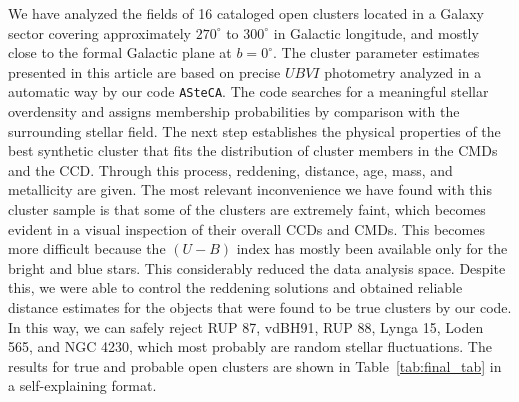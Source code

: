 \documentclass[draft]{aa}
\begin{document}
We have analyzed the fields of 16 cataloged open clusters located in a
Galaxy sector covering approximately $270^\circ$ to $300^\circ$  in
Galactic longitude, and mostly close to the formal Galactic plane at
$b=0^\circ$.
The cluster parameter estimates presented in this article are based on
precise $UBVI$ photometry analyzed in a automatic way by our code 
\texttt{ASteCA}. The code searches for a meaningful stellar overdensity
and assigns membership probabilities by comparison with the surrounding stellar
field.
The next step establishes the physical properties of the best synthetic cluster
that fits the distribution of cluster members in the CMDs and the CCD.
Through this process, reddening, distance, age, mass, and metallicity are
given.
The most relevant inconvenience we have found with this cluster
sample is that some of the clusters are extremely faint, which
becomes evident in a visual inspection of their overall CCDs and CMDs.
This becomes more difficult because the $(U-B)$ index has mostly been available
only for the bright and blue stars. This considerably reduced the data analysis
space. Despite this, we were able to control the reddening solutions
and obtained reliable distance estimates for the objects that were found to be 
true clusters by our code. In this way, we can safely reject RUP 87, vdBH91,
RUP 88, Lynga 15, Loden 565, and NGC 4230, which most probably are random
stellar fluctuations. The results for true and probable open clusters are shown
in Table~\ref{tab:final_tab} in a self-explaining format.
\end{document}
